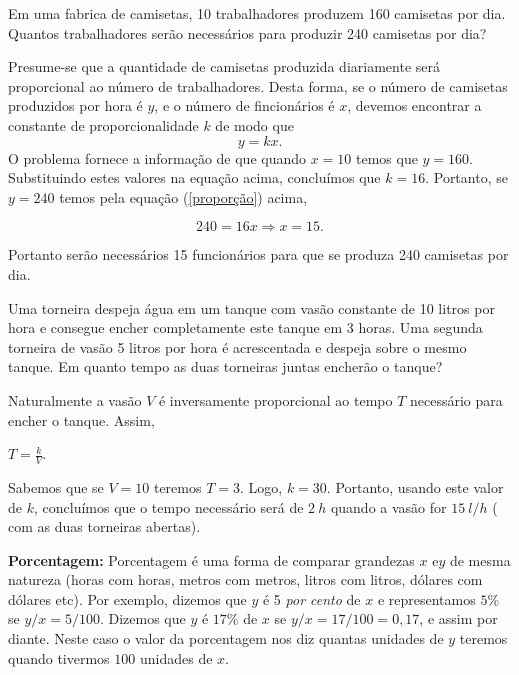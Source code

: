 \begin{exemplo} Em uma fabrica de camisetas, 10 trabalhadores produzem 160 camisetas por dia. Quantos trabalhadores serão necessários para produzir 240 camisetas por dia?

Presume-se que a quantidade de camisetas  produzida diariamente será proporcional ao número de trabalhadores. Desta forma,
se o número de camisetas produzidos por hora é $y$, e o número de fincionários é $x$, devemos encontrar a constante de proporcionalidade $k$ de modo que
\begin{equation}\label{proporção}y=kx.\end{equation}
O problema fornece a informação de que quando $x=10$ temos que $y=160$. Substituindo estes valores na equação acima, concluímos que $k=16$. Portanto, se $y=240$ temos pela equação (\ref{proporção}) acima,

$$240= 16x\Rightarrow x=15.$$

Portanto serão necessários 15 funcionários para que se produza 240 camisetas por dia.
\end{exemplo}

\begin{exemplo} Uma torneira despeja água em um tanque com vasão constante de 10 litros por hora e consegue encher completamente este tanque em 3 horas. Uma segunda torneira de vasão 5 litros por hora é acrescentada e despeja sobre o mesmo tanque. Em quanto tempo as duas torneiras juntas encherão o tanque?

Naturalmente a vasão $V$ é inversamente proporcional ao tempo $T$ necessário para encher o tanque. Assim,

$T=\frac{k}{V}.$

Sabemos que se $V=10$ teremos $T=3$. Logo, $k=30$. Portanto, usando este valor de $k$, concluímos que o tempo necessário será de $2\ h$ quando a vasão for  $15\  l/h$ ( com as duas torneiras abertas).

\end{exemplo}



\noindent\textbf{Porcentagem:} Porcentagem é uma forma de comparar grandezas $x$ e$ y$ de mesma natureza (horas com horas, metros com metros, litros com litros, dólares com dólares etc).  Por exemplo, dizemos que $y$ é 5 \textit{por cento} de $x$ e representamos $5\%$  se $y/x=5/100$. Dizemos que $y$ é $17\%$ de $x$  se $y/x=17/100=0,17$, e assim por diante. Neste caso
o valor da porcentagem nos diz quantas unidades de $y$ teremos quando tivermos $100$ unidades de $x$.

